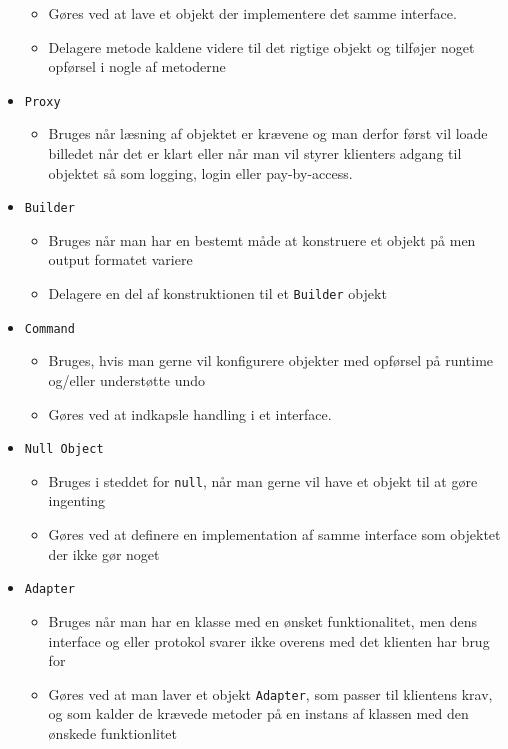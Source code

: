 \documentclass[a4, english]{article}
\begin{document}
\begin{itemize}
\begin{itemize}
    \item Gøres ved at lave et objekt der implementere det samme interface.
    \item Delagere metode kaldene videre til det rigtige objekt og tilføjer noget opførsel i nogle af metoderne
  \end{itemize}
  \item \texttt{Proxy}
  \begin{itemize}
  	\item Bruges når læsning af objektet er krævene og man derfor først vil loade billedet når det er klart eller når man vil styrer klienters adgang til objektet så som logging, login eller pay-by-access.  
  \end{itemize}
  \item \texttt{Builder}
  \begin{itemize}
  	\item Bruges når man har en bestemt måde at konstruere et objekt på men output formatet variere 
    \item Delagere en del af konstruktionen til et \texttt{Builder} objekt
  \end{itemize}
  \item \texttt{Command}
  \begin{itemize}
  	\item Bruges, hvis man gerne vil konfigurere objekter med opførsel på runtime og/eller understøtte undo
    \item Gøres ved at indkapsle handling i et interface.  
  \end{itemize}
  \item \texttt{Null Object}
  \begin{itemize}
  	\item Bruges i steddet for \texttt{null}, når man gerne vil have et objekt til at gøre ingenting
    \item Gøres ved at definere en implementation af samme interface som objektet der ikke gør noget
  \end{itemize}
  \item \texttt{Adapter}
  \begin{itemize}
  	\item Bruges når man har en klasse med en ønsket funktionalitet, men dens interface og eller protokol svarer ikke overens med det klienten har brug for
    \item Gøres ved at man laver et objekt \texttt{Adapter}, som passer til klientens krav, og som kalder de krævede metoder på en instans af klassen med den ønskede funktionlitet 

\end{itemize}
\end{itemize}
\end{document}
